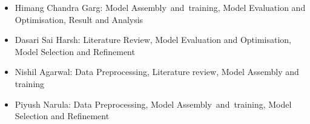 \documentclass[10pt,twocolumn,letterpaper]{article}
\begin{document}
\begin{itemize}\setlength\itemsep{-0.4em}
    \item Himang Chandra Garg: Model Assembly and training, Model Evaluation and Optimisation, Result and Analysis
    \item Dasari Sai Harsh: Literature Review, Model Evaluation and Optimisation, Model Selection and Refinement
    \item Nishil Agarwal: Data Preprocessing, Literature review, Model Assembly and training
    \item Piyush Narula: Data Preprocessing, Model Assembly and training, Model Selection and Refinement
\end{itemize}
\end{document}
